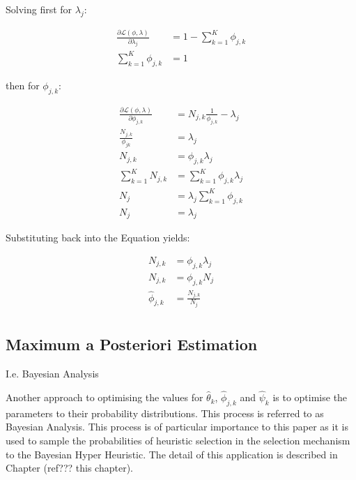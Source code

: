 Solving first for $\lambda_{j}$:

\begin{equation}
    \begin{split}
        \frac{\partial \mathcal{L}(\phi, \lambda)}{\partial \lambda_{j}} &= 1 - \sum_{k=1}^{K} \phi_{j,k}  \\
        \sum_{k=1}^{K} \phi_{j,k}  &= 1
    \end{split}
\end{equation}

then for $\phi_{j,k}$:

\begin{equation}
    \begin{split}
        \frac{\partial \mathcal{L}(\phi, \lambda)}{\partial \phi_{j,k}} &= N_{j,k} \frac{1}{\phi_{j,k}}  - \lambda_{j} \\
        \frac{N_{j,k}}{\phi_{jk}} &= \lambda_{j} \\
        N_{j,k} &= \phi_{j,k} \lambda_{j} \\
        \sum_{k=1}^{K} N_{j,k} &= \sum_{k=1}^{K} \phi_{j,k} \lambda_{j} \\
        N_{j} &= \lambda_{j} \sum_{k=1}^{K} \phi_{j,k} \\
        N_{j} &= \lambda_{j}
    \end{split}
\end{equation}

Substituting back into the Equation yields:

\begin{equation}
    \begin{split}
        N_{j,k} &= \phi_{j,k} \lambda_{j} \\
        N_{j,k} &= \phi_{j,k} N_{j} \\
        \hat{\phi}_{j,k} &= \frac{N_{j,k}}{N_{j}}\\
    \end{split}
\end{equation}

\subsection{Maximum a Posteriori Estimation}
\label{sec:bhh:optimisation:map}

I.e. Bayesian Analysis

Another approach to optimising the values for $\hat{\theta}_{k}$, $\hat{\phi}_{j,k}$ and $\hat{\psi}_{k}$ is to optimise the parameters to their probability distributions. This process is referred to as Bayesian Analysis. This process is of particular importance to this paper as it is used to sample the probabilities of heuristic selection in the selection mechanism to the Bayesian Hyper Heuristic. The detail of this application is described in Chapter (ref??? this chapter).

